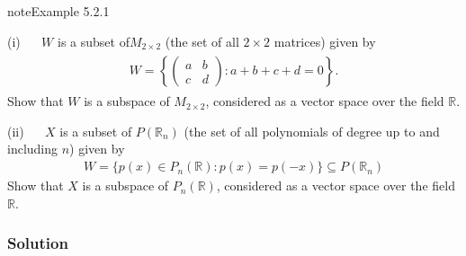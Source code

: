 \documentclass[letterpaper,10pt,english]{jupyterBook}
\begin{document}
\label{_pages/5.2_Subspaces:subspace-example}
\begin{sphinxadmonition}{note}{Example 5.2.1}



\sphinxAtStartPar
(i)   \(W\) is a subset of\(M_{2\times 2}\) (the set of all \(2\times 2\) matrices) given by
\begin{equation*}
\begin{split} \begin{align*}
    W = \left\{ \begin{pmatrix} a & b \\ c & d \end{pmatrix} : a + b + c + d = 0 \right\}.
\end{align*} \end{split}
\end{equation*}
\sphinxAtStartPar
Show that \(W\) is a subspace of \(M_{2\times 2}\), considered as a vector space over the field \(\mathbb{R}\).

\sphinxAtStartPar
(ii)   \(X\) is a subset of \(P(\mathbb{R}_n)\) (the set of all polynomials of degree up to and including \(n\)) given by
\begin{equation*}
\begin{split}W = \{ p(x) \in P_n(\mathbb{R}) : p(x) = p(-x)\} \subseteq P(\mathbb{R}_n)\end{split}
\end{equation*}
\sphinxAtStartPar
Show that \(X\) is a subspace of \(P_n(\mathbb{R})\), considered as a vector space over the field \(\mathbb{R}\).
\subsubsection*{Solution}


\end{sphinxadmonition}
\end{document}

